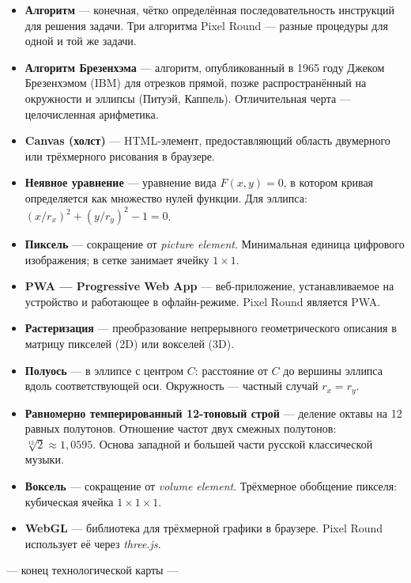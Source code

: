 \documentclass[12pt,a4paper]{scrartcl}
\newcommand{\acc}[1]{\textcolor{accent}{\textbf{#1}}}
\begin{document}
\begin{itemize}[leftmargin=1.4em,itemsep=0.3em,topsep=0.3em]
  \item \acc{Алгоритм} --- конечная, чётко определённая последовательность инструкций для решения задачи. Три алгоритма Pixel Round --- разные процедуры для одной и той же задачи.
  \item \acc{Алгоритм Брезенхэма} --- алгоритм, опубликованный в 1965 году Джеком Брезенхэмом (IBM) для отрезков прямой, позже распространённый на окружности и эллипсы (Питуэй, Каппель). Отличительная черта --- целочисленная арифметика.
  \item \acc{Canvas (холст)} --- HTML-элемент, предоставляющий область двумерного или трёхмерного рисования в браузере.
  \item \acc{Неявное уравнение} --- уравнение вида $F(x, y) = 0$, в котором кривая определяется как множество нулей функции. Для эллипса: $(x/r_x)^2 + (y/r_y)^2 - 1 = 0$.
  \item \acc{Пиксель} --- сокращение от \emph{picture element}. Минимальная единица цифрового изображения; в сетке занимает ячейку $1 \times 1$.
  \item \acc{PWA --- Progressive Web App} --- веб-приложение, устанавливаемое на устройство и работающее в офлайн-режиме. Pixel Round является PWA.
  \item \acc{Растеризация} --- преобразование непрерывного геометрического описания в матрицу пикселей (2D) или вокселей (3D).
  \item \acc{Полуось} --- в эллипсе с центром $C$: расстояние от $C$ до вершины эллипса вдоль соответствующей оси. Окружность --- частный случай $r_x = r_y$.
  \item \acc{Равномерно темперированный 12-тоновый строй} --- деление октавы на 12 равных полутонов. Отношение частот двух смежных полутонов: $\sqrt[12]{2} \approx 1{,}0595$. Основа западной и большей части русской классической музыки.
  \item \acc{Воксель} --- сокращение от \emph{volume element}. Трёхмерное обобщение пикселя: кубическая ячейка $1 \times 1 \times 1$.
  \item \acc{WebGL} --- библиотека для трёхмерной графики в браузере. Pixel Round использует её через \emph{three.js}.
\end{itemize}

\vspace{2em}
\begin{center}
\color{muted}\small\sffamily
--- конец технологической карты ---
\end{center}
\end{document}
